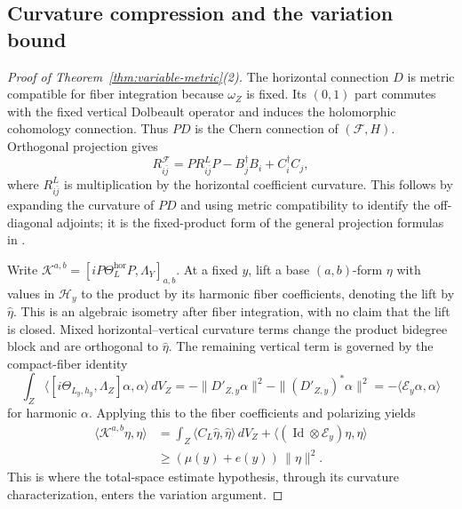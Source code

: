 \documentclass[11pt,reqno]{amsart}
\numberwithin{equation}{section}
\theoremstyle{definition}
\theoremstyle{remark}
\newcommand{\cF}{\mathcal F}
\newcommand{\Id}{\operatorname{Id}}
\newcommand{\ip}[2]{\langle #1,#2\rangle}
\begin{document}
\subsection{Curvature compression and the variation bound}
\begin{proof}[Proof of Theorem~\ref{thm:variable-metric}(2)]
The horizontal connection $D$ is metric compatible for fiber integration because $\omega_Z$ is fixed. Its $(0,1)$ part commutes with the fixed vertical Dolbeault operator and induces the holomorphic cohomology connection. Thus $PD$ is the Chern connection of $(\cF,H)$. Orthogonal projection gives
\begin{equation}\label{eq:variable-gauss}
 R^{\cF}_{i\bar j}
    =P R^L_{i\bar j}P-B_j^\dagger B_i+C_i^\dagger C_j,
\end{equation}
where $R^L_{i\bar j}$ is multiplication by the horizontal coefficient curvature. This follows by expanding the curvature of $PD$ and using metric compatibility to identify the off-diagonal adjoints; it is the fixed-product form of the general projection formulas in \cite[Main Theorem 1 and Section 7]{CS24}.

Write $\mathcal K^{a,b}=[iP\Theta_L^{\mathrm{hor}}P,\Lambda_Y]_{a,b}$. At a fixed $y$, lift a base $(a,b)$-form $\eta$ with values in $\mathcal H_y$ to the product by its harmonic fiber coefficients, denoting the lift by $\widehat\eta$. This is an algebraic isometry after fiber integration, with no claim that the lift is closed. Mixed horizontal--vertical curvature terms change the product bidegree block and are orthogonal to $\widehat\eta$. The remaining vertical term is governed by the compact-fiber identity
\[
 \int_Z\ip{[i\Theta_{L_y,h_y},\Lambda_Z]\alpha}{\alpha}\,dV_Z
     =-\|D'_{Z,y}\alpha\|^2-\|(D'_{Z,y})^*\alpha\|^2
     =-\ip{\mathcal E_y\alpha}{\alpha}
\]
for harmonic $\alpha$. Applying this to the fiber coefficients and polarizing yields
\begin{equation}\label{eq:variable-compression}
 \begin{split}
 \ip{\mathcal K^{a,b}\eta}{\eta}
   &=\int_Z\ip{C_L\widehat\eta}{\widehat\eta}\,dV_Z
       +\ip{(\Id\otimes\mathcal E_y)\eta}{\eta}\\
   &\geq (\mu(y)+e(y))\,\|\eta\|^2.
 \end{split}
\end{equation}
This is where the total-space estimate hypothesis, through its curvature characterization, enters the variation argument.


\end{proof}
\end{document}
